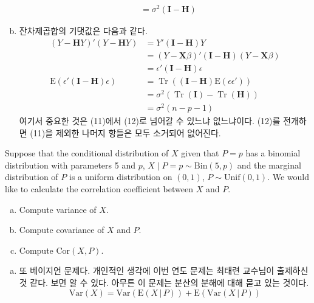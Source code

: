 \documentclass[answers]{exam}
\DeclareMathOperator{\Tr}{Tr}
\begin{document}
\begin{questions}
\begin{solution}
\begin{enumerate}[(a)]
\begin{align}
          &=\sigma^{2}\left(\mathbf{I}-\mathbf{H}\right)
        \end{align}
        \item 잔차제곱합의 기댓값은 다음과 같다.
        \begin{align}
          \left(Y-\mathbf{H}Y\right)'\left(Y-\mathbf{H}Y\right) &= Y'\left(\mathbf{I}-\mathbf{H}\right)Y\\
          &= \left(Y-\mathbf{X}\beta\right)'\left(\mathbf{I}-\mathbf{H}\right)\left(Y-\mathbf{X}\beta\right)\\
          &= \epsilon'\left(\mathbf{I}-\mathbf{H}\right)\epsilon\\
          \mathrm{E}\left(\epsilon'\left(\mathbf{I}-\mathbf{H}\right)\epsilon\right) &= \Tr\left(\left(\mathbf{I}-\mathbf{H}\right)\mathrm{E}\left(\epsilon\epsilon'\right)\right)\\
          &=\sigma^{2}\left(\Tr\left(\mathbf{I}\right)-\Tr\left(\mathbf{H}\right)\right)\\
          &= \sigma^{2}\left(n-p-1\right)
        \end{align}
        여기서 중요한 것은 (11)에서 (12)로 넘어갈 수 있느냐 없느냐이다. (12)를 전개하면 (11)을 제외한 나머지 항들은 모두 소거되어 없어진다.
      \end{enumerate}
    \end{solution}
    \question
    Suppose that the conditional distribution of $X$ given that $P=p$ has a binomial distribution with parameters 5 and $p$, $X\;|\;P=p \sim \mathrm{Bin}\left(5,p\right)$ and the marginal distribution of $P$ is a uniform distribution on $(0,1)$, $P\sim \mathrm{Unif}\left(0,1\right)$. We would like to calculate the correlation coefficient between $X$ and $P$.
    \begin{enumerate}[(a)]
      \item Compute variance of $X$.
      \item Compute covariance of $X$ and $P$.
      \item Compute $\mathrm{Cor}\left(X,P\right)$.
    \end{enumerate}
    \begin{solution}
    	\begin{enumerate}[(a)]
    		\item 또 베이지언 문제다. 개인적인 생각에 이번 연도 문제는 최태련 교수님이 출제하신 것 같다. 보면 알 수 있다. 아무튼 이 문제는 분산의 분해에 대해 묻고 있는 것이다.
    		\begin{equation}
    			\mathrm{Var}\left(X\right) = \mathrm{Var}\left(\mathrm{E}\left(X\,|\,P\right)\right)+\mathrm{E}\left(\mathrm{Var}\left(X\,|\,P\right)\right)

\end{equation}
\end{enumerate}
\end{solution}
\end{questions}
\end{document}

